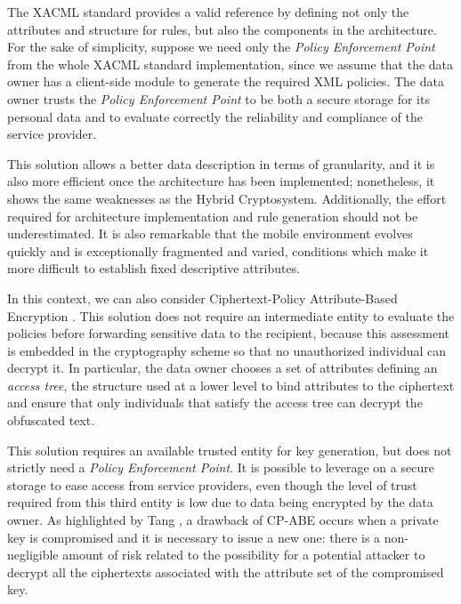 The XACML standard \cite{standard2005extensible} provides a valid reference by defining not only the attributes and structure for rules, but also the components in the architecture. For the sake of simplicity, suppose we need only the \textit{Policy Enforcement Point} from the whole XACML standard implementation, since we assume that the data owner has a client-side module to generate the required XML policies. The data owner trusts the \textit{Policy Enforcement Point} to be both a secure storage for its personal data and to evaluate correctly the reliability and compliance of the service provider. %

This solution allows a better data description in terms of granularity, and it is also more efficient once the architecture has been implemented; nonetheless, it shows the same weaknesses as the Hybrid Cryptosystem. Additionally, the effort required for architecture implementation and rule generation should not be underestimated. It is also remarkable that the mobile environment evolves quickly and is exceptionally fragmented and varied, conditions which make it more difficult to establish fixed descriptive attributes.

In this context, we can also consider Ciphertext-Policy Attribute-Based Encryption \cite{bethencourt2007ciphertext}. This solution does not require an intermediate entity to evaluate the policies before forwarding sensitive data to the recipient, because this assessment is embedded in the cryptography scheme so that no unauthorized individual can decrypt it. In particular, the data owner chooses a set of attributes defining an \textit{access tree}, the structure used at a lower level to bind attributes to the ciphertext and ensure that only individuals that satisfy the access tree can decrypt the obfuscated text.

This solution requires an available trusted entity for key generation, but does not strictly need a \textit{Policy Enforcement Point}. It is possible to leverage on a secure storage to ease access from service providers, even though the level of trust required from this third entity is low due to data being encrypted by the data owner. As highlighted by Tang  \cite{tang2008using}, a drawback of CP-ABE occurs when a private key is compromised and it is necessary to issue a new one: there is a non-negligible amount of risk related to the possibility for a potential attacker to decrypt all the ciphertexts associated with the attribute set of the compromised key.

